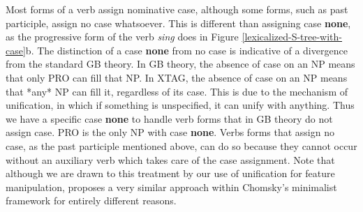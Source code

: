 Most forms of a verb assign nominative case, although some forms, such as past
participle, assign no case whatsoever.  This is different than assigning case
{\bf none}, as the progressive form of the verb {\it sing} does in Figure
\ref{lexicalized-S-tree-with-case}b.  The distinction of a case {\bf none} from
no case is indicative of a divergence from the standard GB theory.  In GB
theory, the absence of case on an NP means that only PRO can fill that NP.  In
XTAG, the absence of case on an NP means that *any* NP can fill it,
regardless of its case.  This is due to the mechanism of unification, in which
if something is unspecified, it can unify with anything.  Thus we have a
specific case {\bf none} to handle verb forms that in GB theory do not assign
case.  PRO is the only NP with case {\bf none}.  Verbs forms that assign no
case, as the past participle mentioned above, can do so because they cannot
occur without an auxiliary verb which takes care of the case assignment.  Note
that although we are drawn to this treatment by our use of unification for
feature manipulation, \cite{watanabe93} proposes a very similar approach within
Chomsky's minimalist framework for entirely different reasons.
